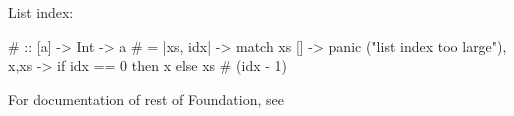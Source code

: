 List index:
\begin{kite}

  {#} :: [a] -> Int -> a
  {#} = |xs, idx| -> {
    match xs {
      [] -> panic ("list index too large"),
      x,xs -> if idx == 0 then x else xs # (idx - 1)
    }
  }
\end{kite}

For documentation of rest of Foundation, see 
